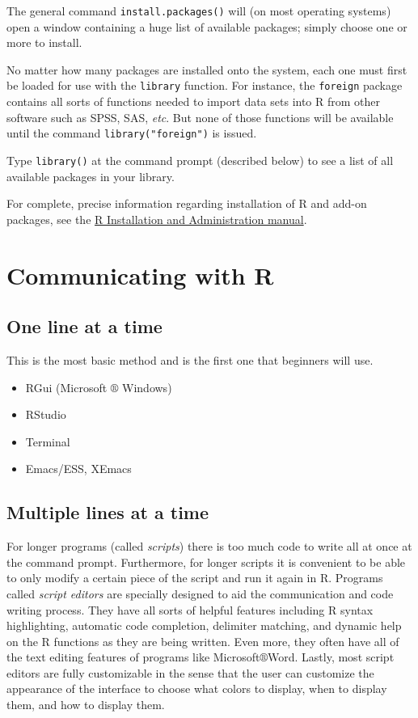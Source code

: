 \documentclass[]{book}
\providecommand{\tightlist}{%
  \setlength{\itemsep}{0pt}\setlength{\parskip}{0pt}}
\numberwithin{equation}{chapter}
\numberwithin{figure}{chapter}
\theoremstyle{plain}
\theoremstyle{definition}
\theoremstyle{remark}
\theoremstyle{definition}
\theoremstyle{definition}
\theoremstyle{remark}
\begin{document}
The general command \texttt{install.packages()} will (on most operating
systems) open a window containing a huge list of available packages;
simply choose one or more to install.

No matter how many packages are installed onto the system, each one must
first be loaded for use with the \texttt{library}
 function. For instance, the
\texttt{foreign} package \autocite{foreign} contains all sorts of
functions needed to import data sets into R from other software such as
SPSS, SAS, \emph{etc}. But none of those functions will be available
until the command \texttt{library("foreign")} is issued.

Type \texttt{library()} at the command prompt (described below) to see a
list of all available packages in your library.

For complete, precise information regarding installation of R and add-on
packages, see the \href{http://cran.r-project.org/manuals.html}{R
Installation and Administration manual}.

\section{Communicating with R}\label{sec-Communicating-with-R}

\subsection{One line at a time}\label{one-line-at-a-time}

This is the most basic method and is the first one that beginners will
use.

\begin{itemize}
\tightlist
\item
  RGui (Microsoft \(\circledR\) Windows)
\item
  RStudio
\item
  Terminal
\item
  Emacs/ESS, XEmacs
\end{itemize}

\subsection{Multiple lines at a time}\label{multiple-lines-at-a-time}

For longer programs (called \emph{scripts}) there is too much code to
write all at once at the command prompt. Furthermore, for longer scripts
it is convenient to be able to only modify a certain piece of the script
and run it again in R. Programs called \emph{script editors} are
specially designed to aid the communication and code writing process.
They have all sorts of helpful features including R syntax highlighting,
automatic code completion, delimiter matching, and dynamic help on the R
functions as they are being written. Even more, they often have all of
the text editing features of programs like Microsoft\(\circledR\)Word.
Lastly, most script editors are fully customizable in the sense that the
user can customize the appearance of the interface to choose what colors
to display, when to display them, and how to display them.
\end{document}

